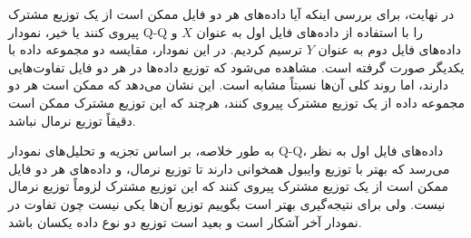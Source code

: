 در نهایت، برای بررسی اینکه آیا داده‌های هر دو فایل ممکن است از یک توزیع مشترک پیروی کنند یا خیر، نمودار Q-Q را با استفاده از داده‌های فایل اول به عنوان \( X \) و داده‌های فایل دوم به عنوان \( Y \) ترسیم کردیم. در این نمودار، مقایسه دو مجموعه داده با یکدیگر صورت گرفته است. مشاهده می‌شود که توزیع داده‌ها در هر دو فایل تفاوت‌هایی دارند، اما روند کلی آن‌ها نسبتاً مشابه است. این نشان می‌دهد که ممکن است هر دو مجموعه داده از یک توزیع مشترک پیروی کنند، هرچند که این توزیع مشترک ممکن است دقیقاً توزیع نرمال نباشد.

به طور خلاصه، بر اساس تجزیه و تحلیل‌های نمودار Q-Q، داده‌های فایل اول به نظر می‌رسد که بهتر با توزیع وایبول همخوانی دارند تا توزیع نرمال، و داده‌های هر دو فایل ممکن است از یک توزیع مشترک پیروی کنند که این توزیع مشترک لزوماً توزیع نرمال نیست. ولی برای نتیجه‌گیری بهتر است بگوییم توزیع آن‌ها یکی نیست چون تفاوت در نمودار آخر آشکار است و بعید است توزیع دو نوع داده یکسان باشد.